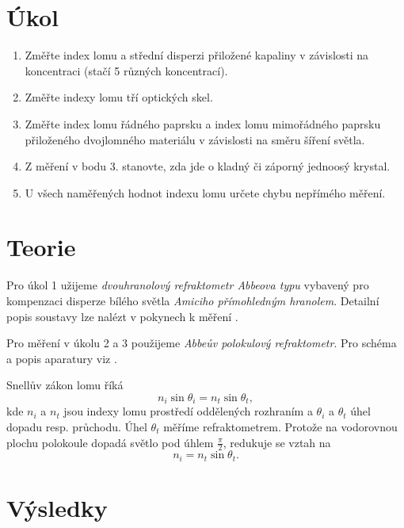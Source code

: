 \documentclass{protokol}
\begin{document}
  \section*{Úkol}

    \begin{enumerate}
      \item Změřte index lomu a střední disperzi přiložené kapaliny v závislosti na koncentraci (stačí 5 různých koncentrací).
      \item Změřte indexy lomu tří optických skel.
      \item Změřte index lomu řádného paprsku a index lomu mimořádného paprsku přiloženého dvojlomného materiálu v závislosti na směru šíření světla.
      \item Z měření v bodu 3. stanovte, zda jde o kladný či záporný jednoosý krystal.
      \item U všech naměřených hodnot indexu lomu určete chybu nepřímého měření.
    \end{enumerate}

  \section*{Teorie}

    Pro úkol 1 užijeme \textit{dvouhranolový refraktometr Abbeova typu} vybavený pro kompenzaci disperze bílého světla \textit{Amiciho přímohledným hranolem}. Detailní popis soustavy lze nalézt v pokynech k měření \cite{pokyny}.

    Pro měření v úkolu 2 a 3 použijeme \textit{Abbeův polokulový refraktometr}. Pro schéma a popis aparatury viz \cite{pokyny}.

    Snellův zákon lomu říká
    \begin{equation}
      n_i \sin \theta_i = n_t \sin \theta_t,
    \end{equation}
    kde $n_i$ a $n_t$ jsou indexy lomu prostředí oddělených rozhraním a $\theta_i$ a $\theta_t$ úhel dopadu resp. průchodu. Úhel $\theta_t$ měříme refraktometrem.
    Protože na vodorovnou plochu polokoule dopadá světlo pod úhlem $\frac{\pi}{2}$, redukuje se vztah na
    \begin{equation} \label{eq:index_lomu}
      n_i = n_t \sin \theta_t.
    \end{equation}

  \section*{Výsledky}
\end{document}
